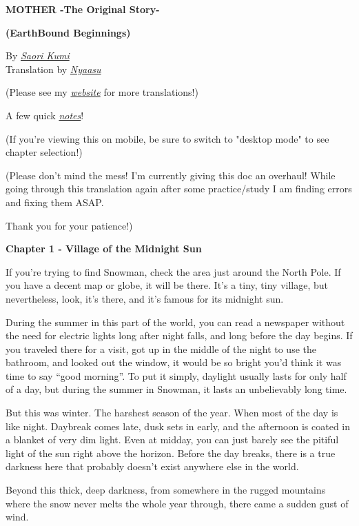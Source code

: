 \documentclass[
]{article}
\author{}
\date{}
\begin{document}
\textbf{MOTHER -The Original Story-}

\textbf{(EarthBound Beginnings)}

By \href{https://twitter.com/kumisaori}{\emph{Saori Kumi}}\\
Translation by
\href{http://www.twitter.com/nyaasunekoban}{\emph{Nyaasu}}

(Please see my \href{http://www.nyaasunobouken.com}{\emph{website}} for
more translations!)

A few quick
\href{https://docs.google.com/document/d/1BakfcrZHzafqgTdGlB_Wwbl7smCl6qxxXjN5WLSqg-A}{\emph{notes}}!

(If you're viewing this on mobile, be sure to switch to "desktop mode"
to see chapter selection!)

(Please don't mind the mess! I'm currently giving this doc an overhaul!
While going through this translation again after some practice/study I
am finding errors and fixing them ASAP.

Thank you for your patience!)

\textbf{ Chapter 1 - Village of the Midnight Sun}

If you're trying to find Snowman, check the area just around the North
Pole. If you have a decent map or globe, it will be there. It's a tiny,
tiny village, but nevertheless, look, it's there, and it's famous for
its midnight sun.

During the summer in this part of the world, you can read a newspaper
without the need for electric lights long after night falls, and long
before the day begins. If you traveled there for a visit, got up in the
middle of the night to use the bathroom, and looked out the window, it
would be so bright you'd think it was time to say ``good morning''. To
put it simply, daylight usually lasts for only half of a day, but during
the summer in Snowman, it lasts an unbelievably long time.

But this was winter. The harshest season of the year. When most of the
day is like night. Daybreak comes late, dusk sets in early, and the
afternoon is coated in a blanket of very dim light. Even at midday, you
can just barely see the pitiful light of the sun right above the
horizon. Before the day breaks, there is a true darkness here that
probably doesn't exist anywhere else in the world.

Beyond this thick, deep darkness, from somewhere in the rugged mountains
where the snow never melts the whole year through, there came a sudden
gust of wind.
\end{document}
